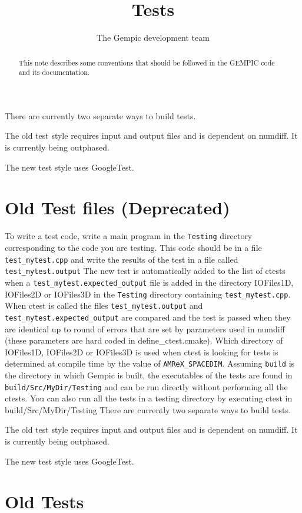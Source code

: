 \documentclass[11pt]{article}
\title{Tests}
\author[1]{The Gempic development team}
\affil[1]{Max-Planck-Institut f\"ur Plasmaphysik, Garching, Germany}
\begin{document}
\maketitle

\begin{abstract}
This note describes some conventions that should be followed in the GEMPIC code
and its documentation.
\end{abstract}

\tableofcontents

There are currently two separate ways to build tests.

The old test style requires input and output files and is dependent on numdiff. It is currently being outphased.

The new test style uses GoogleTest.

\section{Old Test files (Deprecated)}
To write a test code, write a main program in the \verb|Testing| directory corresponding to the code you are testing. This code should be in a file \verb|test_mytest.cpp| and write the results of the test in a file called \verb|test_mytest.output|   
The new test is automatically added to the list of ctests when a \verb|test_mytest.expected_output| file is added in the directory IOFiles1D, IOFiles2D or IOFiles3D in the \verb|Testing| directory containing \verb|test_mytest.cpp|. When ctest is called the files \verb|test_mytest.output| and \verb|test_mytest.expected_output| are compared and the test is passed when they are identical up to round of errors that are set by parameters used in numdiff (these parameters are hard coded in define_ctest.cmake). Which directory of IOFiles1D, IOFiles2D or IOFiles3D is used when ctest is looking for tests is determined at compile time by the value of \verb|AMReX_SPACEDIM|.
Assuming \verb|build| is the directory in which Gempic is built, the executables of the tests are found in \verb|build/Src/MyDir/Testing| and can be run directly without performing all the ctests. You can also run all the tests in a testing directory by executing ctest in build/Src/MyDir/Testing
There are currently two separate ways to build tests.

The old test style requires input and output files and is dependent on numdiff. It is currently being outphased.

The new test style uses GoogleTest.

\section{Old Tests}
\end{document}
